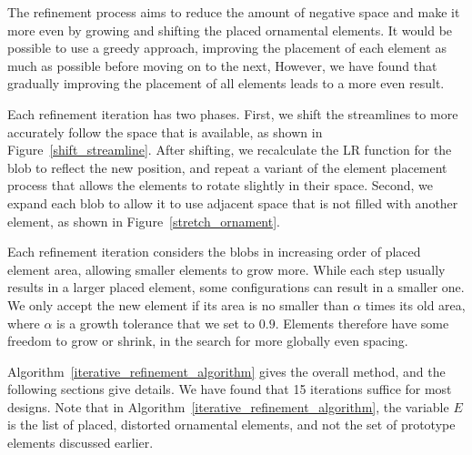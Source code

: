 The refinement process aims to reduce the amount of negative space and make it
more even by growing and shifting the placed ornamental elements. It would be 
possible to use a greedy approach, improving the placement of each element as much
as possible before moving on to the next, However, we have found that gradually
improving the placement of all elements leads to a more even result.

Each refinement
iteration has two phases.
First, we shift the streamlines to more accurately follow the space that is available,
as shown in Figure~\ref{shift_streamline}. After shifting, we recalculate the LR function
for the blob to reflect the new position, and repeat a variant of the
element placement process
that allows the elements to rotate slightly in their space.
Second, we expand each blob to allow it to use adjacent space that is not 
filled with another element, as shown in Figure~\ref{stretch_ornament}.

Each refinement iteration considers the blobs in increasing order of 
placed element area, allowing smaller elements to grow more.   While each step
usually results in a larger placed element, some
configurations can result in a smaller one. We only accept the new element if its
area is no smaller than $\alpha$ times its old area, where $\alpha$ is a growth tolerance
that we set to $0.9$. Elements therefore have some freedom to grow or
shrink, in the search for more globally even spacing.

Algorithm~\ref{iterative_refinement_algorithm}
gives the overall method, and the following sections give details. We have found that
15 iterations suffice for most designs.
Note that in Algorithm~\ref{iterative_refinement_algorithm}, the variable
$E$ is the list of placed, distorted ornamental elements, and
not the set of prototype elements discussed earlier.

